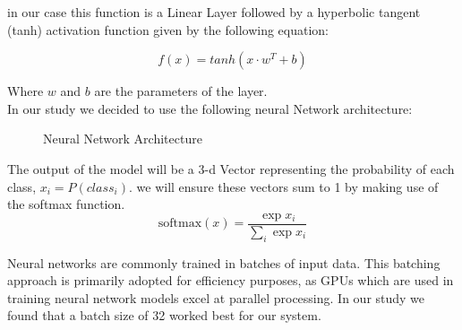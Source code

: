 \documentclass{article}
\begin{document}
in our case this function is a Linear Layer followed by a hyperbolic tangent (tanh) activation function given by the following equation:

\begin{equation}
    f(x) = tanh(x \cdot w^T + b)
\end{equation}

Where $w$ and $b$ are the parameters of the layer. \\

In our study we decided to use the following neural Network architecture:\\

\begin{figure}[ht]
    \centering
    \caption{Neural Network Architecture}
\end{figure}

The output of the model will be a 3-d Vector representing the probability of each class, $x_i = P(class_i)$. we will ensure these vectors sum to 1 by making use of the softmax function.\\

\begin{equation}
    \text{softmax}(x) = \frac{\exp{x_i}}{\sum_i{\exp x_i}}
\end{equation}

Neural networks are commonly trained in batches of input data. This batching approach is primarily adopted for efficiency purposes, as GPUs which are used in training neural network models excel at parallel processing. In our study we found that a batch size of 32 worked best for our system. \\
\end{document}
